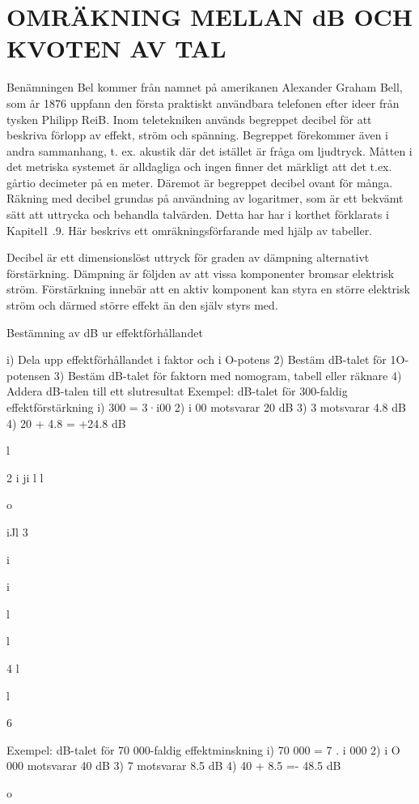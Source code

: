 %
%
%
%
\chapter{OMRÄKNING MELLAN dB OCH KVOTEN AV TAL}

Benämningen Bel kommer från namnet på
amerikanen Alexander Graham Bell, som år
1876 uppfann den första praktiskt användbara telefonen efter ideer från tysken Philipp
ReiB.
Inom teletekniken används begreppet
decibel för att beskriva förlopp av effekt,
ström och spänning. Begreppet förekommer
även i andra sammanhang, t. ex. akustik där
det istället är fråga om ljudtryck.
Måtten i det metriska systemet är alldagliga och ingen finner det märkligt att det
t.ex. gårtio decimeter på en meter. Däremot
är begreppet decibel ovant för många.
Räkning med decibel grundas på användning av logaritmer, som är ett bekvämt
sätt att uttrycka och behandla talvärden.
Detta har har i korthet förklarats i Kapitel1 .9.
Här beskrivs ett omräkningsförfarande med
hjälp av tabeller.

Decibel är ett dimensionslöst uttryck för
graden av dämpning alternativt förstärkning.
Dämpning är följden av att vissa komponenter bromsar elektrisk ström.
Förstärkning innebär att en aktiv komponent kan styra en större elektrisk ström och
därmed större effekt än den själv styrs med.

Bestämning av dB ur effektförhållandet

i) Dela upp effektförhållandet i faktor och
i O-potens
2) Bestäm dB-talet för 1O-potensen
3) Bestäm dB-talet för faktorn med nomogram, tabell eller räknare
4) Addera dB-talen till ett slutresultat
Exempel: dB-talet för 300-faldig effektförstärkning
i) 300 = 3·i00
2) i 00 motsvarar 20 dB
3) 3 motsvarar 4.8 dB
4) 20 + 4.8 = +24.8 dB

l

2
i ji l l

o

iJl
3

i

i

l

l

4
l

l

6

Exempel: dB-talet för 70 000-faldig effektminskning
i) 70 000 = 7 . i 000
2) i O 000 motsvarar 40 dB
3) 7 motsvarar 8.5 dB
4) 40 + 8.5 =- 48.5 dB

o

